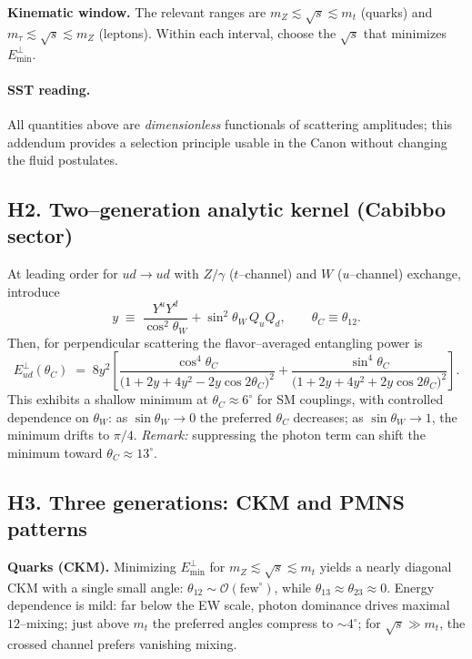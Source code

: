 \documentclass[11pt]{article}
\begin{document}
          \textbf{Kinematic window.}
          The relevant ranges are $m_Z\lesssim\sqrt s\lesssim m_t$ (quarks) and $m_\tau\lesssim\sqrt s\lesssim m_Z$ (leptons). Within each interval, choose the $\sqrt s$ that minimizes $E^{\perp}_{\min}$.

          \paragraph{SST reading.}
              All quantities above are \emph{dimensionless} functionals of scattering amplitudes; this addendum provides a selection principle usable in the Canon without changing the fluid postulates.

  \subsection*{H2. Two–generation analytic kernel (Cabibbo sector)}

      At leading order for $ud\to ud$ with $Z/\gamma$ ($t$–channel) and $W$ ($u$–channel) exchange, introduce
      \begin{equation}
      y\;\equiv\;\frac{Y^u Y^d}{\cos^2\theta_W}+\sin^2\theta_W\,Q_u Q_d,
      \qquad
      \theta_C\equiv\theta_{12}.
      \end{equation}
      Then, for perpendicular scattering the flavor–averaged entangling power is
      \begin{equation}
      \label{eq:Eperpud}
      E^{\perp}_{ud}(\theta_C)
      \;=\;8y^2\!\left[
                     \frac{\cos^4\theta_C}{\big(1+2y+4y^2-2y\cos 2\theta_C\big)^2}
                     +\frac{\sin^4\theta_C}{\big(1+2y+4y^2+2y\cos 2\theta_C\big)^2}
      \right].
      \end{equation}
      This exhibits a shallow minimum at $\theta_C\approx 6^{\circ}$ for SM couplings, with controlled dependence on $\theta_W$: as $\sin\theta_W\!\to\!0$ the preferred $\theta_C$ decreases; as $\sin\theta_W\!\to\!1$, the minimum drifts to $\pi/4$. \emph{Remark:} suppressing the photon term can shift the minimum toward $\theta_C\approx 13^{\circ}$.

  \subsection*{H3. Three generations: CKM and PMNS patterns}

      \textbf{Quarks (CKM).}
      Minimizing $E^{\perp}_{\min}$ for $m_Z\lesssim\sqrt s\lesssim m_t$ yields a nearly diagonal CKM with a single small angle:
      $\theta_{12}\sim\mathcal O(\mathrm{few}^\circ)$, while $\theta_{13}\approx\theta_{23}\approx 0$.
      Energy dependence is mild: far below the EW scale, photon dominance drives maximal $12$–mixing; just above $m_t$ the preferred angles compress to $\sim 4^{\circ}$; for $\sqrt s\gg m_t$, the crossed channel prefers vanishing mixing.
\end{document}

